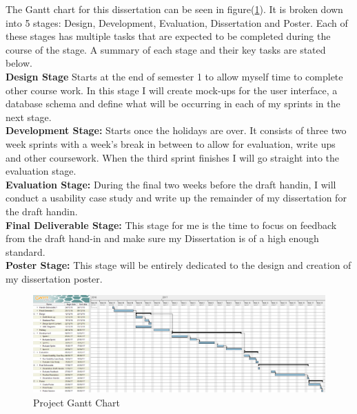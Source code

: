 \documentclass[12pt]{article}  %
\begin{document}
The Gantt chart for this dissertation can be seen in figure(\ref{fig:ganttchart}). It is broken down into 5 stages: Design, Development, Evaluation, Dissertation and Poster. Each of these stages has multiple tasks that are expected to be completed during the course of the stage. A summary of each stage and their key tasks are stated below. \\
\textbf{Design Stage} Starts at the end of semester 1 to allow myself time to complete other course work. In this stage I will create mock-ups for the user interface, a database schema and define what will be occurring in each of my sprints in the next stage.\\
\textbf{Development Stage:} Starts once the holidays are over. It consists of three two week sprints with  a week's break in between to allow for evaluation, write ups and other coursework. When the third sprint finishes I will go straight into the evaluation stage.\\
\textbf{Evaluation Stage: } During the final two weeks before the draft handin, I will conduct a usability case study and write up the remainder of my dissertation for the draft handin.\\
\textbf{Final Deliverable Stage:} This stage  for me is the time to focus on feedback from the draft hand-in and make sure my Dissertation is of a high enough standard.\\
\textbf{Poster Stage:} This stage will be entirely dedicated to the design and creation of my dissertation poster.


\begin{figure}[!htbp]

\includegraphics[width=\textwidth]{images/ganttchart.png}
\caption{Project Gantt Chart}
\label{fig:ganttchart}

\end{figure}




\end{document}
